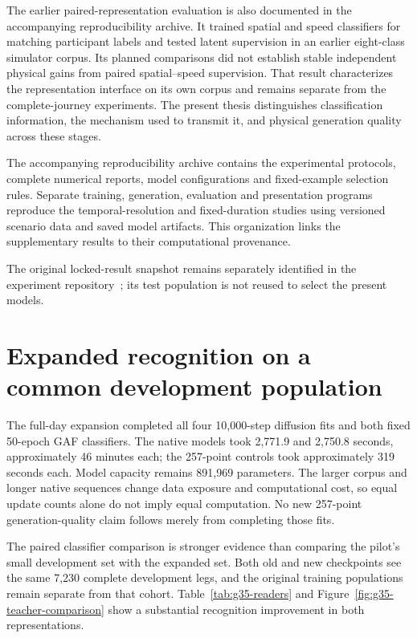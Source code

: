 The earlier paired-representation evaluation is also documented in the accompanying reproducibility archive. It trained spatial and speed classifiers for matching participant labels and tested latent supervision in an earlier eight-class simulator corpus. Its planned comparisons did not establish stable independent physical gains from paired spatial--speed supervision. That result characterizes the representation interface on its own corpus and remains separate from the complete-journey experiments. The present thesis distinguishes classification information, the mechanism used to transmit it, and physical generation quality across these stages.

The accompanying reproducibility archive contains the experimental protocols, complete numerical reports, model configurations and fixed-example selection rules. Separate training, generation, evaluation and presentation programs reproduce the temporal-resolution and fixed-duration studies using versioned scenario data and saved model artifacts. This organization links the supplementary results to their computational provenance.

The original locked-result snapshot remains separately identified in the experiment repository~\cite{project}; its test population is not reused to select the present models.


\FloatBarrier
\section{Expanded recognition on a common development population}
\label{sec:corpus-reader-supplement}

The full-day expansion completed all four 10,000-step diffusion fits and both fixed 50-epoch GAF classifiers. The native models took 2,771.9 and 2,750.8 seconds, approximately 46 minutes each; the 257-point controls took approximately 319 seconds each. Model capacity remains 891,969 parameters. The larger corpus and longer native sequences change data exposure and computational cost, so equal update counts alone do not imply equal computation. No new 257-point generation-quality claim follows merely from completing those fits.

The paired classifier comparison is stronger evidence than comparing the pilot's small development set with the expanded set. Both old and new checkpoints see the same 7,230 complete development legs, and the original training populations remain separate from that cohort. Table~\ref{tab:g35-readers} and Figure~\ref{fig:g35-teacher-comparison} show a substantial recognition improvement in both representations.

